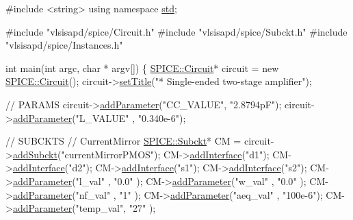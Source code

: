 \begin{DoxyCodeInclude}
\textcolor{preprocessor}{#include <string>}
\textcolor{keyword}{using namespace }\mbox{\hyperlink{namespacestd}{std}};

\textcolor{preprocessor}{#include "vlsisapd/spice/Circuit.h"}
\textcolor{preprocessor}{#include "vlsisapd/spice/Subckt.h"}
\textcolor{preprocessor}{#include "vlsisapd/spice/Instances.h"}

\textcolor{keywordtype}{int} main(\textcolor{keywordtype}{int} argc, \textcolor{keywordtype}{char} * argv[]) \{
    \mbox{\hyperlink{class_s_p_i_c_e_1_1_circuit}{SPICE::Circuit}}* circuit = \textcolor{keyword}{new} \mbox{\hyperlink{class_s_p_i_c_e_1_1_circuit}{SPICE::Circuit}}();
    circuit->\mbox{\hyperlink{class_s_p_i_c_e_1_1_circuit_a798df9ebd558e22c85eeceb5202e3123}{setTitle}}(\textcolor{stringliteral}{"* Single-ended two-stage amplifier"});

    \textcolor{comment}{// PARAMS}
    circuit->\mbox{\hyperlink{class_s_p_i_c_e_1_1_circuit_ab3ab147a16bc490ce96db905a4ca271c}{addParameter}}(\textcolor{stringliteral}{"CC\_VALUE"}, \textcolor{stringliteral}{"2.8794pF"});
    circuit->\mbox{\hyperlink{class_s_p_i_c_e_1_1_circuit_ab3ab147a16bc490ce96db905a4ca271c}{addParameter}}(\textcolor{stringliteral}{"L\_VALUE"} , \textcolor{stringliteral}{"0.340e-6"});

    \textcolor{comment}{// SUBCKTS}
    \textcolor{comment}{// CurrentMirror}
    \mbox{\hyperlink{class_s_p_i_c_e_1_1_subckt}{SPICE::Subckt}}* CM = circuit->\mbox{\hyperlink{class_s_p_i_c_e_1_1_circuit_a0d1352e46d4537ce1e5f651de40e91a6}{addSubckt}}(\textcolor{stringliteral}{"currentMirrorPMOS"});
    CM->\mbox{\hyperlink{class_s_p_i_c_e_1_1_subckt_ac162264683fa3d9b3384d3e8cc291fa2}{addInterface}}(\textcolor{stringliteral}{"d1"});
    CM->\mbox{\hyperlink{class_s_p_i_c_e_1_1_subckt_ac162264683fa3d9b3384d3e8cc291fa2}{addInterface}}(\textcolor{stringliteral}{"d2"});
    CM->\mbox{\hyperlink{class_s_p_i_c_e_1_1_subckt_ac162264683fa3d9b3384d3e8cc291fa2}{addInterface}}(\textcolor{stringliteral}{"s1"});
    CM->\mbox{\hyperlink{class_s_p_i_c_e_1_1_subckt_ac162264683fa3d9b3384d3e8cc291fa2}{addInterface}}(\textcolor{stringliteral}{"s2"});
    CM->\mbox{\hyperlink{class_s_p_i_c_e_1_1_subckt_ab3ab147a16bc490ce96db905a4ca271c}{addParameter}}(\textcolor{stringliteral}{"l\_val"}   , \textcolor{stringliteral}{"0.0"}   );
    CM->\mbox{\hyperlink{class_s_p_i_c_e_1_1_subckt_ab3ab147a16bc490ce96db905a4ca271c}{addParameter}}(\textcolor{stringliteral}{"w\_val"}   , \textcolor{stringliteral}{"0.0"}   );
    CM->\mbox{\hyperlink{class_s_p_i_c_e_1_1_subckt_ab3ab147a16bc490ce96db905a4ca271c}{addParameter}}(\textcolor{stringliteral}{"nf\_val"}  , \textcolor{stringliteral}{"1"}     );
    CM->\mbox{\hyperlink{class_s_p_i_c_e_1_1_subckt_ab3ab147a16bc490ce96db905a4ca271c}{addParameter}}(\textcolor{stringliteral}{"aeq\_val"} , \textcolor{stringliteral}{"100e-6"});
    CM->\mbox{\hyperlink{class_s_p_i_c_e_1_1_subckt_ab3ab147a16bc490ce96db905a4ca271c}{addParameter}}(\textcolor{stringliteral}{"temp\_val"}, \textcolor{stringliteral}{"27"}    );


\end{DoxyCodeInclude}
